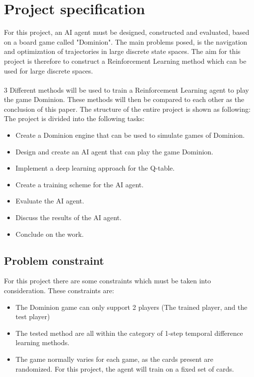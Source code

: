 \chapter{Project specification} \label{ch:intro}
For this project, an AI agent must be designed, constructed and evaluated, based on a board game called "Dominion". The main problems posed, is the navigation and optimization of trajectories in large discrete state spaces. The aim for this project is therefore to construct a Reinforcement Learning method which can be used for large discrete spaces.\\\\
3 Different methods will be used to train a Reinforcement Learning agent to play the game Dominion. These methods will then be compared to each other as the conclusion of this paper. The structure of the entire project is shown as following:
The project is divided into the following tasks:
\begin{itemize}
    \item Create a Dominion engine that can be used to simulate games of Dominion.
    \item Design and create an AI agent that can play the game Dominion.
    \item Implement a deep learning approach for the Q-table.
    \item Create a training scheme for the AI agent.
    \item Evaluate the AI agent.
    \item Discuss the results of the AI agent.
    \item Conclude on the work.
\end{itemize}



\section{Problem constraint}
For this project there are some constraints which must be taken into consideration. These constraints are:
\begin{itemize}
    \item The Dominion game can only support 2 players (The trained player, and the test player)
    \item The tested method are all within the category of 1-step temporal difference learning methods.
    \item The game normally varies for each game, as the cards present are randomized. For this project, the agent will train on a fixed set of cards.
\end{itemize}

